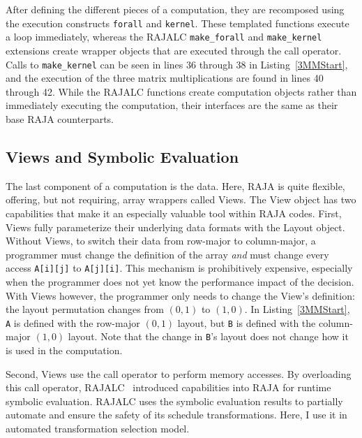 After defining the different pieces of a computation, they are recomposed using the execution constructs \verb.forall. and \verb.kernel..
These templated functions execute a loop immediately, whereas the RAJALC \verb.make_forall. and \verb.make_kernel. extensions create wrapper objects that are executed through the call operator. 
Calls to \verb.make_kernel. can be seen in lines 36 through 38 in Listing~\ref{3MMStart}, and the execution of the three matrix multiplications are found in lines 40 through 42. 
While the RAJALC functions create computation objects rather than immediately executing the computation, their interfaces are the same as their base RAJA counterparts.

\subsection{Views and Symbolic Evaluation}

The last component of a computation is the data.
Here, RAJA is quite flexible, offering, but not requiring, array wrappers called Views.
The View object has two capabilities that make it an especially valuable tool within RAJA codes.
First, Views fully parameterize their underlying data formats with the Layout object.
Without Views, to switch their data from row-major to column-major, a programmer must change the definition of the array \textit{and} must change every access \verb.A[i][j]. to \verb.A[j][i]..
This mechanism is prohibitively expensive, especially when the programmer does not yet know the performance impact of the decision.
With Views however, the programmer only needs to change the View's definition: the layout permutation changes from $(0,1)$ to $(1,0)$. 
In Listing~\ref{3MMStart}, \verb.A. is defined with the row-major $(0,1)$ layout, but \verb.B. is defined with the column-major $(1,0)$ layout. 
Note that the change in \verb.B.'s layout does not change how it is used in the computation. 

Second, Views use the call operator to perform memory accesses. 
By overloading this call operator, RAJALC~\cite{neth2021inter} introduced capabilities into RAJA for runtime symbolic evaluation.
RAJALC uses the symbolic evaluation results to partially automate and ensure the safety of its schedule transformations.
Here, I use it in automated transformation selection model.

